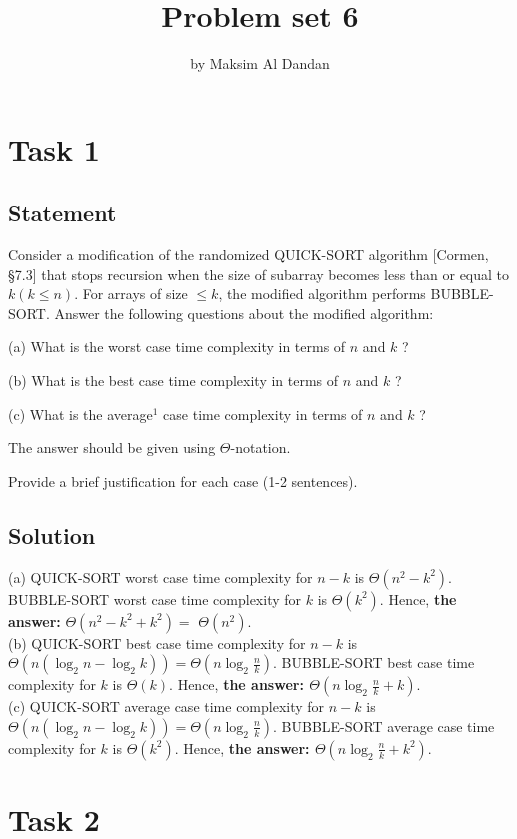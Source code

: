 \documentclass[10pt]{article}
\title{Problem set 6}
\author{by Maksim Al Dandan}
\begin{document}
\maketitle


\section{Task 1}
\subsection{Statement}

Consider a modification of the randomized QUICK-SORT algorithm [Cormen, §7.3] that stops recursion when the size of subarray becomes less than or equal to $k (k \leq n)$. For arrays of size $\leq k$, the modified algorithm performs BUBBLE-SORT. Answer the following questions about the modified algorithm:

(a) What is the worst case time complexity in terms of $n$ and $k$ ?

(b) What is the best case time complexity in terms of $n$ and $k$ ?

(c) What is the average${}^{1}$ case time complexity in terms of $n$ and $k$ ?

The answer should be given using $\Theta$-notation.

Provide a brief justification for each case (1-2 sentences).

\subsection{Solution}

(a) QUICK-SORT worst case time complexity for $n - k$ is $\Theta(n^2 - k^2)$. BUBBLE-SORT worst case time complexity for $k$ is $\Theta(k^2)$. Hence, \textbf{the answer:} $\Theta(n^2 - k^2 + k^2) = $ \textbf{$\Theta(n^2)$}. \\
(b) QUICK-SORT best case time complexity for $n - k$ is $\Theta(n(\log_2n - \log_2k)) = \Theta(n\log_2{\frac{n}{k}})$. BUBBLE-SORT best case time complexity for $k$ is $\Theta(k)$. Hence, \textbf{the answer: $\Theta(n\log_2{\frac{n}{k}} + k)$}. \\
(c) QUICK-SORT average case time complexity for $n - k$ is $\Theta(n(\log_2n - \log_2k)) = \Theta(n\log_2{\frac{n}{k}})$. BUBBLE-SORT average case time complexity for $k$ is $\Theta(k^2)$. Hence, \textbf{the answer: $\Theta(n\log_2{\frac{n}{k}} + k^2)$}.

\section{Task 2}
\end{document}
